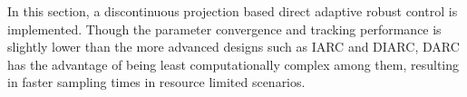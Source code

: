 In this section, a discontinuous projection based direct adaptive robust control
is implemented. Though the parameter convergence and tracking performance is
slightly lower than the  more advanced designs such as IARC and DIARC, DARC has
the advantage of being least computationally complex among them, resulting in
faster sampling times in resource limited scenarios.





